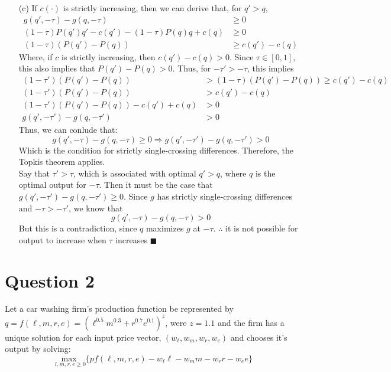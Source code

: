 \documentclass{article}
\newcommand{\usmax}[1]{\underset{#1}{\text{max }}}
\begin{document}
\begin{itemize}
	\item[(c)] If $c(\cdot)$ is strictly increasing, then we can derive that, for $q'>q$,
		\begin{align*}
				g(q', -\tau)-g(q,-\tau) 					&\geq 0				\\
				(1-\tau)P(q')q'-c(q')-(1-\tau)P(q)q+c(q)	&\geq 0				\\
				(1-\tau)(P(q')-P(q))						&\geq c(q')-c(q)	
		\end{align*}
		Where, if $c$ is strictly increasing, then $c(q')-c(q)>0$. Since $\tau\in[0,1]$, this also implies that $P(q')-P(q)>0$. Thus, for $-\tau'>-\tau$, this implies 
			\begin{align*}
				(1-\tau')(P(q')-P(q)) 				&> (1-\tau)(P(q')-P(q)) \geq c(q')-c(q)		\\
				(1-\tau')(P(q')-P(q)) 				&> c(q')-c(q)								\\
				(1-\tau')(P(q')-P(q))-c(q')+c(q) 	&> 0										\\
				g(q',-\tau') - g(q,-\tau')			&> 0 
		\end{align*}
		Thus, we can conlude that:
		\[
			g(q', -\tau)-g(q,-\tau) \geq 0 \Rightarrow g(q',-\tau') - g(q,-\tau') > 0 
		\]
		Which is the condition for strictly single-crossing differences. Therefore, the Topkis theorem applies.
		\medskip \\
		Say that $\tau'>\tau$, which is associated with optimal $q'>q$, where $q$ is the optimal output for $-\tau$. Then it must be the case that $g(q',-\tau')-g(q,-\tau')\geq 0$. Since $g$ has strictly single-crossing differences and $-\tau>-\tau'$, we know that
		\[
			g(q',-\tau) - g(q,-\tau) > 0
		\]
		But this is a contradiction, since $q$ maximizes $g$ at $-\tau$. $\therefore$ it is not possible for output to increase when $\tau$ increases $\blacksquare$
	
\end{itemize}	


\section*{Question 2}
Let a car washing firm's production function be represented by $q=f(\ell,m,r,e)=\left(\ell^{0.5}m^{0.3}+r^{0.7}e^{0.1}\right)^z$, were $z=1.1$ and the firm has a unique solution for each input price vector, $(w_\ell,w_m,w_r,w_e)$ and chooses it's output by solving:
\[
	\usmax{l,m,r,e\geq0}\{pf(\ell,m,r,e) - w_\ell\ell-w_mm-w_rr-w_ee\}
\]
\end{document}
